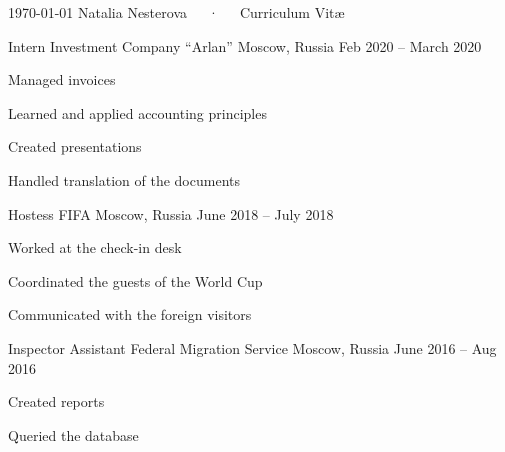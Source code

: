 \documentclass[11pt, a4paper]{awesome-cv}
\begin{document}
\makecvheader[C]

\makecvfooter
  {\today}
  {Natalia Nesterova~~~·~~~Curriculum Vitæ}
  {\thepage}


%
%
%
%
%
%
%
%

\begin{cventries}
\cventry
	{Intern}
	{Investment Company ``Arlan''}
	{Moscow, Russia}
	{Feb 2020 -- March 2020}
	{
		\begin{cvitems}
			\item{Managed invoices}
			\item{Learned and applied accounting principles}
			\item{Created presentations}
			\item{Handled translation of the documents}		
		\end{cvitems}
	}
	
\cventry
	{Hostess}
	{FIFA}
	{Moscow, Russia}
	{June 2018 -- July 2018}
	{
		\begin{cvitems}
			\item{Worked at the check-in desk}
			\item{Coordinated the guests of the World Cup}
			\item{Communicated with the foreign visitors}
		\end{cvitems}
	}
	
\cventry
	{Inspector Assistant}
	{Federal Migration Service}
	{Moscow, Russia}
	{June 2016 -- Aug 2016}
	{
		\begin{cvitems}
			\item{Created reports}
			\item{Queried the database}
		\end{cvitems}
	}
	
\end{cventries}
\end{document}
